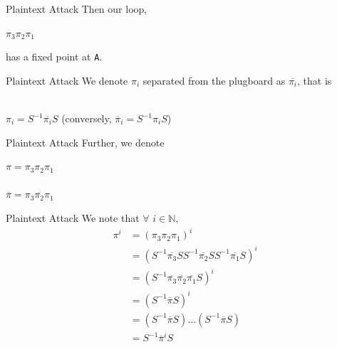 \documentclass[hyphens,aspectratio=169]{beamer}
\begin{document}
\begin{frame}[fragile]{Plaintext Attack}
	Then our loop,
	\begin{center}
		$\pi_{3}\pi_2\pi_1$
	\end{center}
	has a fixed point at \texttt{A}.
\end{frame}

\begin{frame}[fragile]{Plaintext Attack}
	We denote $\pi_i$ separated from the plugboard as $\overline{\pi_i}$, that is \\\\
	\begin{center}
		$\pi_i = S^{-1}\overline{\pi_i}S$
		(conversely, $\overline\pi_i = S^{-1}\pi_iS$)
	\end{center}
\end{frame}

\begin{frame}[fragile]{Plaintext Attack}
	Further, we denote\\
	\begin{center}
		$\pi = \pi_{3}\pi_2\pi_1$\\\text{}\\
		$\overline{\pi} = \overline{\pi_{3}\pi_2\pi_1}$
	\end{center}
\end{frame}


\begin{frame}[fragile]{Plaintext Attack}
	We note that $\forall$ $i\in\mathbb{N}$,
	\begin{align*}
		\pi^{i} & = (\pi_{3}\pi_2\pi_1)^{i}                                                      \\
		    & = (S^{-1}\overline{\pi_{3}}SS^{-1}\overline{\pi_2}SS^{-1}\overline{\pi_1}S)^{i}
		\\&= (S^{-1}\overline{\pi_{3}}\overline{\pi_2}\overline{\pi_1}S)^{i}
		\\&= (S^{-1}\overline{\pi}S)^{i}
        \\&= (S^{-1}\overline{\pi}S)\dots(S^{-1}\overline{\pi}S)
        \\&= S^{-1}\overline\pi^{i}S
	\end{align*}
\end{frame}

\end{document}
